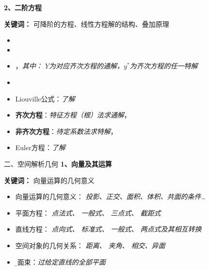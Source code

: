 \begin{frame}
	\linespread{1.2}
	{\bf 2、二阶方程} 
	
	{\b{\bf 关键词：} 可降阶的方程、线性方程解的结构、叠加原理} 
	\begin{itemize}
	  \item {} 
	  \item {}
	  \item {}，{\it 其中：
	  	$Y$为对应齐次方程的通解，$y^*$为齐次方程的任一特解}
  	  \item {}
	  
	  \item {\color{gray!50!white} Liouville公式：\it 了解}
	\end{itemize}
\end{frame}

\begin{frame}
	\linespread{1.2}
	
	\begin{itemize}
	  \item {\bf 齐次方程}：{\it 特征方程（根）法求通解}，	  
	  \item {\bf 非齐次方程}：{\it 待定系数法求特解}， 
	  \item {\color{gray!50!white} Euler方程：\it 了解}
	\end{itemize}
\end{frame}

\begin{frame}{二、空间解析几何}
	\linespread{1.2} 
	{\bf 1、向量及其运算} 
	
	{\b{\bf 关键词：} 向量运算的几何意义} 
	\begin{itemize}
	  \item 向量运算的几何意义： {\it 投影、正交、面积、体积、共面的条件\ldots}
	  \item 平面方程： {\it 点法式、 一般式、 三点式、 截距式} 
	  \item 直线方程： {\it 点向式、 标准式、 一般式、 两点式及其相互转换} 
	  \item 空间对象的几何关系： {\it 距离、 夹角、 相交、{\color{red}异面}}
	  \item {\b 平面束}：{\it 过给定直线的全部平面}
	\end{itemize}
\end{frame}

